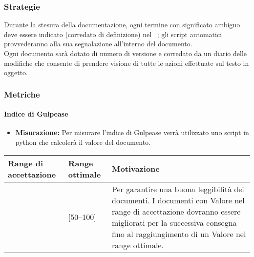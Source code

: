 \subsubsection{Strategie}
Durante la stesura della documentazione, ogni termine con significato ambiguo deve essere indicato (corredato di definizione) nel \glossario\ ; gli script automatici provvederanno alla sua segnalazione all'interno del documento.\\
Ogni documento sarà dotato di numero di versione e corredato da un diario delle modifiche che consente di prendere visione di tutte le azioni effettuate sul testo in oggetto.

\subsubsection{Metriche}

\paragraph{Indice di Gulpease}

\begin{itemize}
\item \textbf{Misurazione:} Per misurare l'indice di Gulpease verrà utilizzato uno script in python che calcolerà il valore del documento.
\end{itemize}

\begin{center}

		\begin{tabular}{|P{2.5cm}|P{2.5cm}|P{6cm}|}
		\hline
			\textbf{Range di accettazione}	& \textbf{Range ottimale} & \textbf{Motivazione} \\
			\hline
			[40 -- 100] & [50--100] &	Per garantire una buona leggibilità dei documenti. I documenti con Valore nel range di accettazione dovranno essere migliorati per la successiva consegna fino al raggiungimento di un Valore nel range ottimale. \\
			\hline
			\end{tabular}
\end{center}